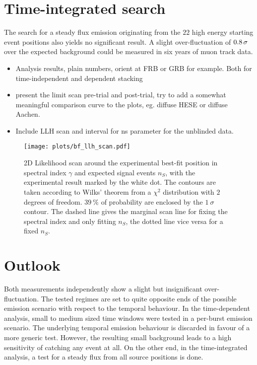 \section*{Time-integrated search}
The search for a steady flux emission originating from the $\num{22}$ high energy starting event positions also yields no significant result.
A slight over-fluctuation of $\num{0.8}\,\sigma$ over the expected background could be measured in six years of muon track data.


\begin{itemize}
  \item Analysis results, plain numbers, orient at FRB or GRB for example.
  Both for time-independent and dependent stacking
  \item present the limit scan pre-trial and post-trial, try to add a somewhat meaningful comparison curve to the plots, eg. diffuse HESE or diffuse Aachen.
  \item Include LLH scan and interval for ns parameter for the unblinded data.
\end{itemize}

\begin{figure}[htbp]
  \centering
  \texttt{[image: plots/bf\_llh\_scan.pdf]}
  \caption{
    2D Likelihood scan around the experimental best-fit position in spectral index $\gamma$ and expected signal events $n_S$, with the experimental result marked by the white dot.
    The contours are taken according to Wilks' theorem from a $\chi^2$ distribution with $\num{2}$ degrees of freedom.
    $\SI{39}{\percent}$ of probability are enclosed by the $\SI{1}{\sigma}$ contour.
    The dashed line gives the marginal scan line for fixing the spectral index and only fitting $n_S$, the dotted line vice versa for a fixed $n_S$.}
\end{figure}



\section{Outlook}
Both measurements independently show a slight but insignificant over-fluctuation.
The tested regimes are set to quite opposite ends of the possible emission scenario with respect to the temporal behaviour.
In the time-dependent analysis, small to medium sized time windows were tested in a per-burst emission scenario.
The underlying temporal emission behaviour is discarded in favour of a more generic test.
However, the resulting small background leads to a high sensitivity of catching any event at all.
On the other end, in the time-integrated analysis, a test for a steady flux from all source positions is done.

